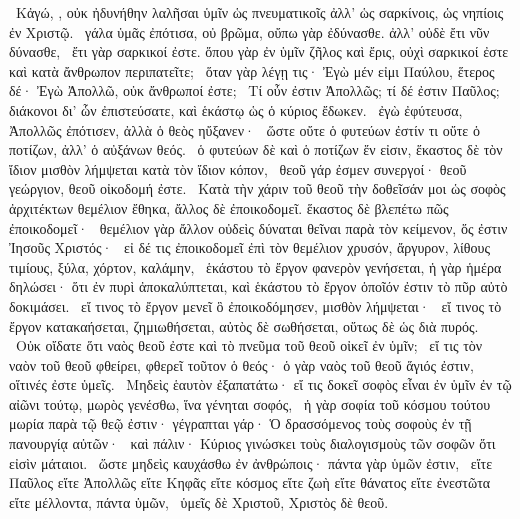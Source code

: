 ~Κἀγώ, , οὐκ ἠδυνήθην λαλῆσαι ὑμῖν ὡς πνευματικοῖς ἀλλ’ ὡς σαρκίνοις, ὡς νηπίοις ἐν Χριστῷ.
~γάλα ὑμᾶς ἐπότισα, οὐ βρῶμα, οὔπω γὰρ ἐδύνασθε. ἀλλ’ οὐδὲ ἔτι νῦν δύνασθε,
~ἔτι γὰρ σαρκικοί ἐστε. ὅπου γὰρ ἐν ὑμῖν ζῆλος καὶ ἔρις, οὐχὶ σαρκικοί ἐστε καὶ κατὰ ἄνθρωπον περιπατεῖτε;
~ὅταν γὰρ λέγῃ τις· Ἐγὼ μέν εἰμι Παύλου, ἕτερος δέ· Ἐγὼ Ἀπολλῶ, οὐκ ἄνθρωποί ἐστε;
~Τί οὖν ἐστιν Ἀπολλῶς; τί δέ ἐστιν Παῦλος; διάκονοι δι’ ὧν ἐπιστεύσατε, καὶ ἑκάστῳ ὡς ὁ κύριος ἔδωκεν.
~ἐγὼ ἐφύτευσα, Ἀπολλῶς ἐπότισεν, ἀλλὰ ὁ θεὸς ηὔξανεν·
~ὥστε οὔτε ὁ φυτεύων ἐστίν τι οὔτε ὁ ποτίζων, ἀλλ’ ὁ αὐξάνων θεός.
~ὁ φυτεύων δὲ καὶ ὁ ποτίζων ἕν εἰσιν, ἕκαστος δὲ τὸν ἴδιον μισθὸν λήμψεται κατὰ τὸν ἴδιον κόπον,
~θεοῦ γάρ ἐσμεν συνεργοί· θεοῦ γεώργιον, θεοῦ οἰκοδομή ἐστε.
~Κατὰ τὴν χάριν τοῦ θεοῦ τὴν δοθεῖσάν μοι ὡς σοφὸς ἀρχιτέκτων θεμέλιον ἔθηκα, ἄλλος δὲ ἐποικοδομεῖ. ἕκαστος δὲ βλεπέτω πῶς ἐποικοδομεῖ·
~θεμέλιον γὰρ ἄλλον οὐδεὶς δύναται θεῖναι παρὰ τὸν κείμενον, ὅς ἐστιν Ἰησοῦς Χριστός·
~εἰ δέ τις ἐποικοδομεῖ ἐπὶ τὸν θεμέλιον χρυσόν, ἄργυρον, λίθους τιμίους, ξύλα, χόρτον, καλάμην,
~ἑκάστου τὸ ἔργον φανερὸν γενήσεται, ἡ γὰρ ἡμέρα δηλώσει· ὅτι ἐν πυρὶ ἀποκαλύπτεται, καὶ ἑκάστου τὸ ἔργον ὁποῖόν ἐστιν τὸ πῦρ αὐτὸ δοκιμάσει.
~εἴ τινος τὸ ἔργον μενεῖ ὃ ἐποικοδόμησεν, μισθὸν λήμψεται·
~εἴ τινος τὸ ἔργον κατακαήσεται, ζημιωθήσεται, αὐτὸς δὲ σωθήσεται, οὕτως δὲ ὡς διὰ πυρός.
~Οὐκ οἴδατε ὅτι ναὸς θεοῦ ἐστε καὶ τὸ πνεῦμα τοῦ θεοῦ οἰκεῖ ἐν ὑμῖν;
~εἴ τις τὸν ναὸν τοῦ θεοῦ φθείρει, φθερεῖ τοῦτον ὁ θεός· ὁ γὰρ ναὸς τοῦ θεοῦ ἅγιός ἐστιν, οἵτινές ἐστε ὑμεῖς.
~Μηδεὶς ἑαυτὸν ἐξαπατάτω· εἴ τις δοκεῖ σοφὸς εἶναι ἐν ὑμῖν ἐν τῷ αἰῶνι τούτῳ, μωρὸς γενέσθω, ἵνα γένηται σοφός,
~ἡ γὰρ σοφία τοῦ κόσμου τούτου μωρία παρὰ τῷ θεῷ ἐστιν· γέγραπται γάρ· Ὁ δρασσόμενος τοὺς σοφοὺς ἐν τῇ πανουργίᾳ αὐτῶν·
~καὶ πάλιν· Κύριος γινώσκει τοὺς διαλογισμοὺς τῶν σοφῶν ὅτι εἰσὶν μάταιοι.
~ὥστε μηδεὶς καυχάσθω ἐν ἀνθρώποις· πάντα γὰρ ὑμῶν ἐστιν,
~εἴτε Παῦλος εἴτε Ἀπολλῶς εἴτε Κηφᾶς εἴτε κόσμος εἴτε ζωὴ εἴτε θάνατος εἴτε ἐνεστῶτα εἴτε μέλλοντα, πάντα ὑμῶν,
~ὑμεῖς δὲ Χριστοῦ, Χριστὸς δὲ θεοῦ.

